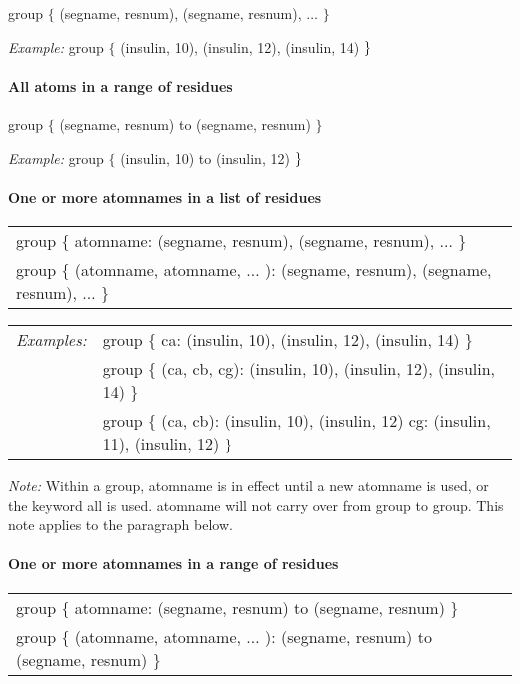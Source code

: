 group $\{$ (segname, resnum), (segname, resnum), $\ldots $ $\}$

{\em Example:} group $\{$ (insulin, 10), (insulin, 12), (insulin, 14) $%
\}\medskip $

\paragraph*{All atoms in a range of residues}

group $\{$ (segname, resnum) to (segname, resnum) $\}$

{\em Example:} group $\{$ (insulin, 10) to (insulin, 12) $\}\medskip $

\paragraph*{One or more atomnames in a list of residues}

\begin{tabular}{l}
group $\{$ atomname: (segname, resnum), (segname, resnum), $\ldots $ $\}$ \\ 
group $\{$ (atomname, atomname, $\ldots $ ): (segname, resnum), (segname,
resnum), $\ldots $ $\}$%
\end{tabular}

\begin{tabular}{ll}
{\em Examples:} & group $\{$ ca: (insulin, 10), (insulin, 12), (insulin, 14) 
$\}$ \\ 
& group $\{$ (ca, cb, cg): (insulin, 10), (insulin, 12), (insulin, 14) $\}$
\\ 
& group $\{$ (ca, cb): (insulin, 10), (insulin, 12) cg: (insulin, 11),
(insulin, 12) $\}\smallskip $%
\end{tabular}
\medskip 

{\em Note: }Within a group, atomname is in effect until a new atomname is
used, or the keyword all is used. atomname will not carry over from group to
group. This note applies to the paragraph below.\medskip 

\paragraph*{One or more atomnames in a range of residues}

\begin{tabular}{l}
group $\{$ atomname: (segname, resnum) to (segname, resnum) $\}$ \\ 
group $\{$ (atomname, atomname, $\ldots $ ): (segname, resnum) to (segname,
resnum) $\}$%
\end{tabular}

